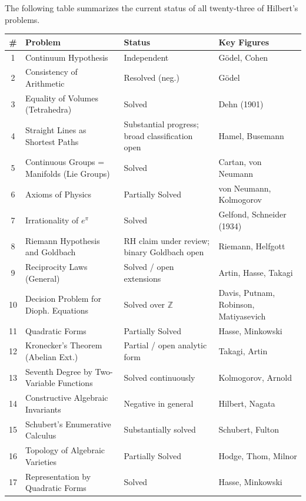 The following table summarizes the current status of all twenty-three of Hilbert's problems.

\begin{center}
\footnotesize
\setlength{\tabcolsep}{3.5pt}
\renewcommand{\arraystretch}{1.15}
\begin{tabular}{c >{\raggedright\arraybackslash}p{3.8cm} >{\raggedright\arraybackslash}p{2.5cm} >{\raggedright\arraybackslash}p{3.8cm}}
\toprule
\textbf{\#} & \textbf{Problem} & \textbf{Status} & \textbf{Key Figures} \\
\midrule
1 & Continuum Hypothesis & Independent & G\"odel, Cohen \\
2 & Consistency of Arithmetic & Resolved (neg.) & G\"odel \\
3 & Equality of Volumes (Tetrahedra) & Solved & Dehn (1901) \\
4 & Straight Lines as Shortest Paths & Substantial progress; broad classification open & Hamel, Busemann \\
5 & Continuous Groups = Manifolds (Lie Groups) & Solved & Cartan, von Neumann \\
6 & Axioms of Physics & Partially Solved & von Neumann, Kolmogorov \\
7 & Irrationality of $e^\pi$ & Solved & Gelfond, Schneider (1934) \\
8 & Riemann Hypothesis and Goldbach & RH claim under review; binary Goldbach open & Riemann, Helfgott \\
9 & Reciprocity Laws (General) & Solved / open extensions & Artin, Hasse, Takagi \\
10 & Decision Problem for Dioph. Equations & Solved over $\mathbb{Z}$ & Davis, Putnam, Robinson, Matiyasevich \\
11 & Quadratic Forms & Partially Solved & Hasse, Minkowski \\
12 & Kronecker's Theorem (Abelian Ext.) & Partial / open analytic form & Takagi, Artin \\
13 & Seventh Degree by Two-Variable Functions & Solved continuously & Kolmogorov, Arnold \\
14 & Constructive Algebraic Invariants & Negative in general & Hilbert, Nagata \\
15 & Schubert's Enumerative Calculus & Substantially solved & Schubert, Fulton \\
16 & Topology of Algebraic Varieties & Partially Solved & Hodge, Thom, Milnor \\
17 & Representation by Quadratic Forms & Solved & Hasse, Minkowski \\

\end{tabular}
\end{center}
